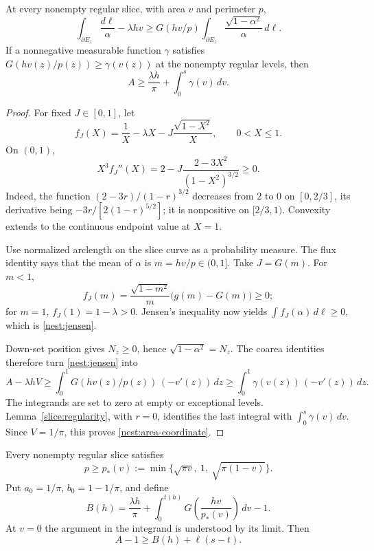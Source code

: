 \begin{lemma}\label{nest:integrated-flux}
At every nonempty regular slice, with area $v$ and perimeter $p$,
\begin{equation}\label{nest:jensen}
 \int_{\partial E_z}\frac{d\ell}{\alpha}-\lambda hv
 \geq
 G(hv/p)\int_{\partial E_z}
       \frac{\sqrt{1-\alpha^2}}{\alpha}\,d\ell.
\end{equation}
If a nonnegative measurable function $\gamma$ satisfies
$G(hv(z)/p(z))\geq\gamma(v(z))$ at the nonempty regular levels, then
\begin{equation}\label{nest:area-coordinate}
 A\geq\frac{\lambda h}{\pi}+\int_0^s\gamma(v)\,dv.
\end{equation}
\end{lemma}

\begin{proof}
For fixed $J\in[0,1]$, let
\[
 f_J(X)=\frac1X-\lambda X-J\frac{\sqrt{1-X^2}}X,
 \qquad 0<X\leq1.
\]
On $(0,1)$,
\[
 X^3f_J''(X)=2-J\frac{2-3X^2}{(1-X^2)^{3/2}}\geq0.
\]
Indeed, the function $(2-3r)/(1-r)^{3/2}$ decreases from $2$ to $0$
on $[0,2/3]$, its derivative being
$-3r/[2(1-r)^{5/2}]$; it is nonpositive on $[2/3,1)$.
Convexity extends to the continuous endpoint value at $X=1$.

Use normalized arclength on the slice curve as a probability measure.
The flux identity says that the mean of $\alpha$ is
$m=hv/p\in(0,1]$.  Take $J=G(m)$.  For $m<1$,
\[
 f_J(m)=\frac{\sqrt{1-m^2}}m\bigl(g(m)-G(m)\bigr)\geq0;
\]
for $m=1$, $f_J(1)=1-\lambda>0$.  Jensen's inequality now yields
$\int f_J(\alpha)\,d\ell\geq0$, which is
\eqref{nest:jensen}.

Down-set position gives $N_z\geq0$, hence
$\sqrt{1-\alpha^2}=N_z$.  The coarea identities therefore turn
\eqref{nest:jensen} into
\[
 A-\lambda hV
 \geq\int_0^1G(hv(z)/p(z))\,(-v'(z))\,dz
 \geq\int_0^1\gamma(v(z))\,(-v'(z))\,dz.
\]
The integrands are set to zero at empty or exceptional levels.
Lemma~\ref{slice:regularity}, with $r=0$, identifies the last integral
with $\int_0^s\gamma(v)\,dv$. Since $V=1/\pi$, this proves
\eqref{nest:area-coordinate}.
\end{proof}

\begin{lemma}
\label{nest:planar-patterns}
Every nonempty regular slice satisfies
\begin{equation}\label{nest:planar-bound}
 p\geq p_*(v):=
 \min\{\sqrt{\pi v},\ 1,\ \sqrt{\pi(1-v)}\}.
\end{equation}
Put $a_0=1/\pi$, $b_0=1-1/\pi$, and define
\begin{equation}\label{nest:baseline}
 B(h)=\frac{\lambda h}{\pi}
       +\int_0^{t(h)}G\!\left(\frac{hv}{p_*(v)}\right)\,dv-1.
\end{equation}
At $v=0$ the argument in the integrand is understood by its limit.
Then
\begin{equation}\label{nest:baseline-slack}
 A-1\geq B(h)+\ell(s-t).
\end{equation}
\end{lemma}

